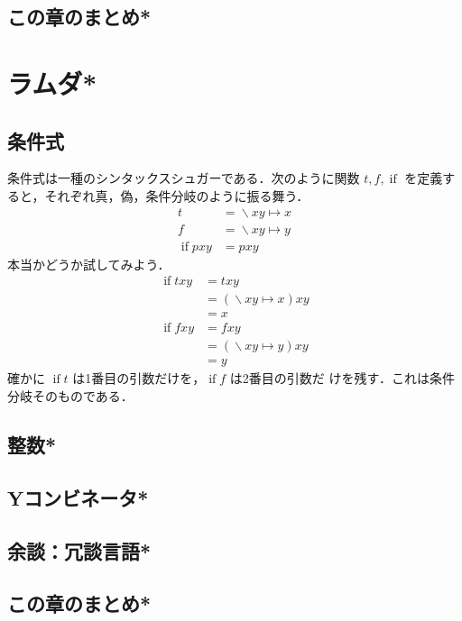 \documentclass[a5paper,twoside,fleqn,draft]{jsbook}
\newcommand{\mSpecialFunc}[1]{#1}
\DeclareMathOperator{\mIfFunc}{\mSpecialFunc{if}}
\DeclareMathOperator{\mLambda}{\backslash}
\DeclareMathOperator{\mLambdaArrow}{\mapsto}
\newcommand{\mLambdaEXP}[2]{\mLambda{#1}\mLambdaArrow{#2}} %
\begin{document}
\section{この章のまとめ*}


\chapter{ラムダ*}

\section{条件式}

条件式は一種のシンタックスシュガーである．次のように関数
$t,f,\mIfFunc$ を定義すると，それぞれ真，偽，条件分岐のように振る舞う．
\begin{align}
t&=\mLambdaEXP{xy}{x}\\
f&=\mLambdaEXP{xy}{y}\\
\mIfFunc pxy&=pxy
\end{align}
本当かどうか試してみよう．
\begin{align}
\mIfFunc txy&=txy\\
&=(\mLambdaEXP{xy}{x})xy\\
&=x\\
\mIfFunc fxy&=fxy\\
&=(\mLambdaEXP{xy}{y})xy\\
&=y
\end{align}
確かに $\mIfFunc t$ は1番目の引数だけを，$\mIfFunc f$ は2番目の引数だ
けを残す．これは条件分岐そのものである．

\section{整数*}
\section{Yコンビネータ*}


\section{余談：冗談言語*}


\section{この章のまとめ*}
\end{document}
